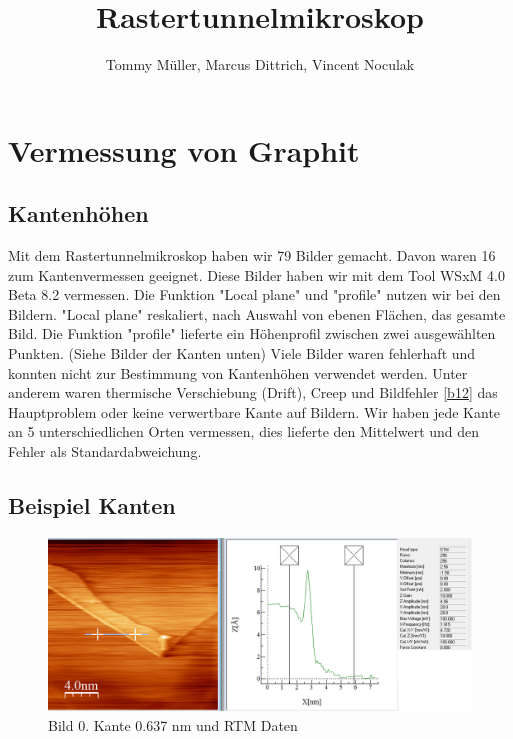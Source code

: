 \documentclass[10pt,a4paper]{article}
\author{Tommy Müller, Marcus Dittrich, Vincent Noculak}
\title{Rastertunnelmikroskop}
\begin{document}
\maketitle
\newpage
\tableofcontents
\newpage

\section{Vermessung von Graphit }

\subsection{ Kantenhöhen}

Mit dem Rastertunnelmikroskop haben wir 79 Bilder gemacht. Davon waren 16 zum Kantenvermessen geeignet.
Diese Bilder haben wir mit dem Tool WSxM 4.0 Beta 8.2 vermessen. 
Die Funktion "Local plane" und "profile" nutzen wir bei den Bildern. "Local plane" reskaliert, nach Auswahl von ebenen Flächen, das gesamte Bild.  Die Funktion "profile" lieferte ein Höhenprofil zwischen zwei ausgewählten Punkten. (Siehe Bilder der Kanten unten)
Viele Bilder waren fehlerhaft und konnten nicht zur Bestimmung von Kantenhöhen verwendet werden. Unter anderem waren thermische Verschiebung (Drift), Creep und Bildfehler  \ref{b12} das Hauptproblem oder keine verwertbare Kante auf Bildern. Wir haben jede Kante an 5 unterschiedlichen Orten vermessen, dies lieferte den Mittelwert und den Fehler als Standardabweichung.



\subsection{Beispiel Kanten}

\begin{figure}[]
	\includegraphics[scale = 0.3]{bild00.png}
	\centering
	\caption{Bild 0. Kante 0.637 nm und RTM Daten}
	\label{b0}
\end{figure}
\end{document}
